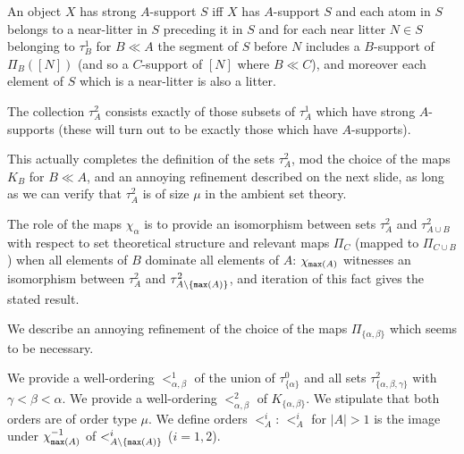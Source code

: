 \documentclass{slides}
\begin{document}
\begin{slide}

An object $X$ has strong $A$-support $S$ iff $X$ has $A$-support $S$ and each atom in $S$ belongs to a near-litter in $S$ preceding it in $S$ and for each near litter $N \in S$ belonging to $\tau^1_B$ for $B \ll A$ the segment of $S$
before $N$ includes  a $B$-support of $\Pi_B([N])$ (and so a $C$-support of $[N]$ where $B \ll C$), and moreover each element of $S$ which is a near-litter is also a litter.

\end{slide}

\begin{slide}

The collection $\tau^2_A$ consists exactly of those subsets of $\tau^1_A$ which have strong $A$-supports (these will turn out to be exactly those which have $A$-supports).

This actually completes the definition of the sets $\tau^2_A$, mod the choice of the maps $K_B$ for $B \ll A$, and an annoying refinement described on the next slide, as long as we can verify that $\tau^2_A$ is of size $\mu$
in the ambient set theory.

The role of the maps $\chi_{\alpha}$ is to provide an isomorphism between sets $\tau^2_A$ and $\tau^2_{A \cup B}$ with respect to set theoretical structure and relevant maps $\Pi_C$ (mapped to $\Pi_{C \cup B}$) when all elements of $B$ dominate all elements of $A$:
$\chi_{{\tt max}(A)}$ witnesses an isomorphism between $\tau^2_A$ and $\tau^2_{A \setminus \{{\tt max}(A)\}}$, and iteration of this fact gives the stated result.

\end{slide}

\begin{slide}

We describe an annoying refinement of the choice of the maps $\Pi_{\{\alpha,\beta\}}$ which seems to be necessary.

We provide a well-ordering $<^1_{\alpha,\beta}$ of the union of $\tau^0_{\{\alpha\}}$ and all sets $\tau^2_{\{\alpha,\beta,\gamma\}}$ with $\gamma<\beta<\alpha$.  We provide a well-ordering $<^2_{\alpha,\beta}$ of $K_{\{\alpha,\beta\}}$.  We stipulate that both orders are of order type $\mu$.  We define orders $<^i_A$:  $<^i_A$ for $|A|>1$ is the image under $\chi_{{\tt max}(A)}^{-1}$ of $<^i_{A \setminus \{{\tt max}(A)\}}$ ($i=1,2$).

\end{slide}
\end{document}
